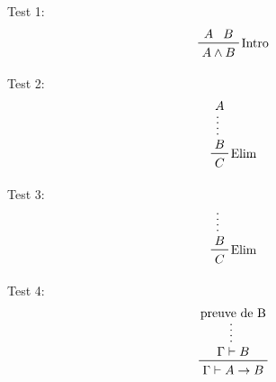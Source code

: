 \documentclass{article}
\begin{document}
Test 1:
\[ \prftree[r]{Intro}{A}{B}{A \land B} \]

Test 2:
\[ \prftree[r]{Elim}{\prfsummary{A}{B}}{C} \]

Test 3:
\[ \prftree[r]{Elim}{\prfsummary{B}}{C} \]

Test 4:
\[ \prftree{\prfsummary{ \text{preuve de B} }{\Gamma \vdash B}}{\Gamma \vdash A \to B} \]
\end{document}
